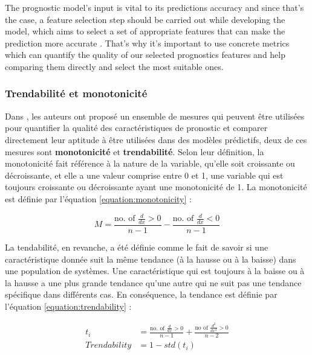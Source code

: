 The prognostic model's input is vital to its predictions accuracy \cite{coble2009} and since that's the case, a feature selection step should be carried out while developing the model, which aims to select a set of appropriate features that can make the prediction more accurate \cite{javed2012}. That's why it's important to use concrete metrics which can quantify the quality of our selected prognostics features and help comparing them directly and select the most suitable ones.

\subsubsection{Trendabilité et monotonicité}%
\label{subsub:trendability_and_monotonicity}
Dans \cite{coble2009}, les auteurs ont proposé un ensemble de mesures qui peuvent être utilisées pour quantifier la qualité des caractéristiques de pronostic et comparer directement leur aptitude à être utilisées dans des modèles prédictifs, deux de ces mesures sont \textbf{monotonicité} et \textbf{trendabilité}. Selon leur définition, la monotonicité fait référence à la nature de la variable, qu'elle soit croissante ou décroissante, et elle a une valeur comprise entre 0 et 1, une variable qui est toujours croissante ou décroissante ayant une monotonicité de 1. La monotonicité est définie par l'équation \ref{equation:monotonicity} : 

\begin{equation}
	M=\frac{\text{no. of }\frac{d}{dx} > 0}{n-1} - \frac{\text{no. of }\frac{d}{dx} < 0}{n-1}
\label{equation:monotonicity}
\end{equation}

La tendabilité, en revanche, a été définie comme le fait de savoir si une caractéristique donnée suit la même tendance (à la hausse ou à la baisse) dans une population de systèmes. Une caractéristique qui est toujours à la baisse ou à la hausse a une plus grande tendance qu'une autre qui ne suit pas une tendance spécifique dans différents cas. En conséquence, la tendance est définie par l'équation \ref{equation:trendability} :  

\begin{equation}
	\begin{aligned}
		t_i&= \frac{\text{no. of }\frac{d}{dx}>0}{n-1}+\frac{\text{no of } \frac{d^2}{dx^2}>0}{n-2}\\
Trendability&=1-std(t_i)
	\end{aligned}
	\label{equation:trendability}
\end{equation}

